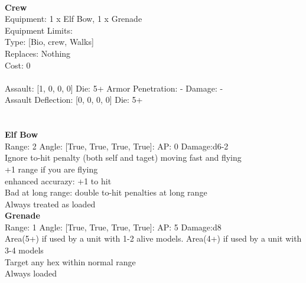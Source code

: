  
\ \\

{\bf Crew } \\
Equipment: 1 x Elf Bow, 1 x Grenade \\
Equipment Limits:  \\
Type: [Bio, crew, Walks] \\
Replaces: Nothing \\
Cost: 0\\
\ \\
Assault: [1, 0, 0, 0] Die: 5+ Armor Penetration: - Damage: - \\
Assault Deflection: [0, 0, 0, 0] Die: 5+\\
\indent  
\ \\

\ \\
{\bf Elf Bow } \\



Range: 2  Angle: [True, True, True, True]: AP: 0 Damage:d6-2 \\
Ignore to-hit penalty (both self and taget) moving fast and flying\\ 
+1 range if you are flying\\ 
enhanced accurazy: +1 to hit\\ 
Bad at long range: double to-hit penalties at long range\\ 
Always treated as loaded\\ 




{\bf Grenade } \\



Range: 1  Angle: [True, True, True, True]: AP: 5 Damage:d8 \\
Area(5+) if used by a unit with 1-2 alive models. Area(4+) if used by a unit with 3-4 models\\ 
Target any hex within normal range\\ 
Always loaded\\ 




 
\ \\



